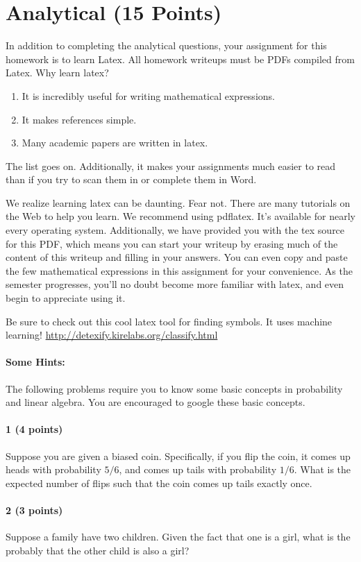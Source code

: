 \documentclass[11pt]{article}
\begin{document}
\section{Analytical (15 Points)}
In addition to completing the analytical questions, your assignment for this homework is to learn Latex. All homework writeups must be PDFs compiled from Latex. Why learn latex?
\begin{enumerate}
\item It is incredibly useful for writing mathematical expressions.
\item It makes references simple.
\item Many academic papers are written in latex.
\end{enumerate}
The list goes on. Additionally, it makes your assignments much easier to read than if you try to scan them in or complete them in Word.

We realize learning latex can be daunting. Fear not. There are many tutorials on the Web to help you learn. We recommend using pdflatex. It's available for nearly every operating system. Additionally, we have provided you with the tex source for this PDF, which means you can start your writeup by erasing much of the content of this writeup and filling in your answers. You can even copy and paste the few mathematical expressions in this assignment for your convenience. As the semester progresses, you'll no doubt become more familiar with latex, and even begin to appreciate using it.

Be sure to check out this cool latex tool for finding symbols. It uses machine learning! \url{http://detexify.kirelabs.org/classify.html}


\paragraph{Some Hints:} The following problems require you to know some basic concepts in probability and linear algebra. You are encouraged to google these basic concepts.

\paragraph{1 (4 points)} Suppose you are given a biased coin. Specifically, if you flip the coin, it comes up heads with probability $5/6$, and comes up tails with probability $1/6$.  What is the expected number of flips such that the coin comes up tails exactly once.

\paragraph{2 (3 points)} Suppose a family have two children. Given the fact that one is a girl, what is the probably that the other child is also a girl?
\end{document}
